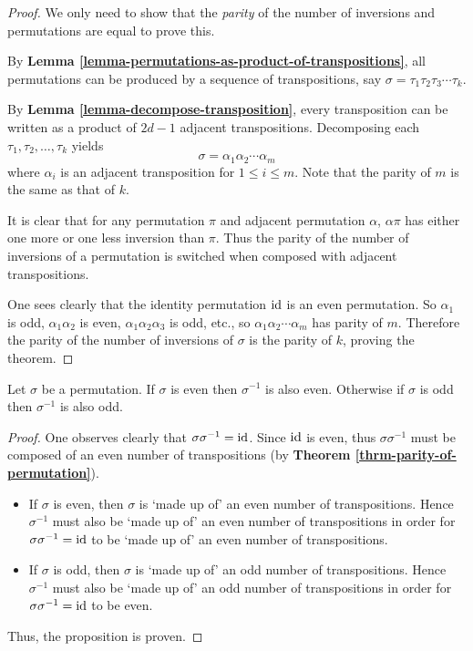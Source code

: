 \begin{proof}
    We only need to show that the \textit{parity} of the number of inversions and permutations are equal to prove this.

    By \textbf{Lemma \ref{lemma-permutations-as-product-of-transpositions}}, all permutations can be produced by a sequence of transpositions, say $\sigma = \tau_1\tau_2\tau_3\cdots\tau_k$.

    By \textbf{Lemma \ref{lemma-decompose-transposition}}, every transposition can be written as a product of $2d - 1$ adjacent transpositions. Decomposing each $\tau_1, \tau_2, \dots, \tau_k$ yields
    \[
        \sigma = \alpha_1\alpha_2\cdots\alpha_m
    \]
    where $\alpha_i$ is an adjacent transposition for $1 \leq i \leq m$. Note that the parity of $m$ is the same as that of $k$.

    It is clear that for any permutation $\pi$ and adjacent permutation $\alpha$, $\alpha\pi$ has either one more or one less inversion than $\pi$. Thus the parity of the number of inversions of a permutation is switched when composed with adjacent transpositions.

    One sees clearly that the identity permutation $\mathrm{id}$ is an even permutation. So $\alpha_1$ is odd, $\alpha_1\alpha_2$ is even, $\alpha_1\alpha_2\alpha_3$ is odd, etc., so $\alpha_1\alpha_2\cdots\alpha_m$ has parity of $m$. Therefore the parity of the number of inversions of $\sigma$ is the parity of $k$, proving the theorem.
\end{proof}

\begin{proposition}\label{prop-permutation-and-inverse-have-same-parity}
    Let $\sigma$ be a permutation. If $\sigma$ is even then $\sigma^{-1}$ is also even. Otherwise if $\sigma$ is odd then $\sigma^{-1}$ is also odd.
\end{proposition}
\begin{proof}
    One observes clearly that $\sigma\sigma^{-1} = \mathrm{id}$. Since $\mathrm{id}$ is even, thus $\sigma\sigma^{-1}$ must be composed of an even number of transpositions (by \textbf{Theorem \ref{thrm-parity-of-permutation}}).
    \begin{itemize}
        \item If $\sigma$ is even, then $\sigma$ is `made up of' an even number of transpositions. Hence $\sigma^{-1}$ must also be `made up of' an even number of transpositions in order for $\sigma\sigma^{-1} = \mathrm{id}$ to be `made up of' an even number of transpositions.
        \item If $\sigma$ is odd, then $\sigma$ is `made up of' an odd number of transpositions. Hence $\sigma^{-1}$ must also be `made up of' an odd number of transpositions in order for $\sigma\sigma^{-1} = \mathrm{id}$ to be even.
    \end{itemize}
    Thus, the proposition is proven.
\end{proof}

